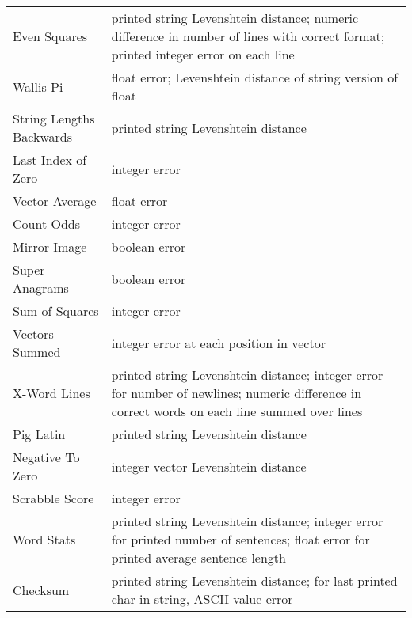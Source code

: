 \documentclass{sig-alternate}
\begin{document}
\begin{table*}[t]
\begin{tabular}{>{\raggedright}p{4cm} >{\raggedright}p{11cm}}
Even Squares               & printed string Levenshtein distance; numeric difference in number of lines with correct format; printed integer error on each line                        \tabularnewline
Wallis Pi                  & float error; Levenshtein distance of string version of float                                                                          \tabularnewline
String Lengths Backwards   & printed string Levenshtein distance                                                                                                   \tabularnewline
Last Index of Zero         & integer error                                                                                                                  \tabularnewline
Vector Average             & float error                                                                                                                    \tabularnewline
Count Odds                 & integer error                                                                                                                  \tabularnewline
Mirror Image               & boolean error                                                                                                                  \tabularnewline
Super Anagrams             & boolean error                                                                                                                  \tabularnewline
Sum of Squares             & integer error                                                                                                                  \tabularnewline
Vectors Summed             & integer error at each position in vector \tabularnewline
X-Word Lines               & printed string Levenshtein distance; integer error for number of newlines; numeric difference in correct words on each line summed over lines \tabularnewline
Pig Latin                  & printed string Levenshtein distance                                                                                                   \tabularnewline
Negative To Zero           & integer vector Levenshtein distance                                                                                                   \tabularnewline
Scrabble Score             & integer error                                                                                                                  \tabularnewline
Word Stats                 & printed string Levenshtein distance; integer error for printed number of sentences; float error for printed average sentence length             \tabularnewline
Checksum                   & printed string Levenshtein distance; for last printed char in string, ASCII value error \tabularnewline

\end{tabular}
\end{table*}
\end{document}
